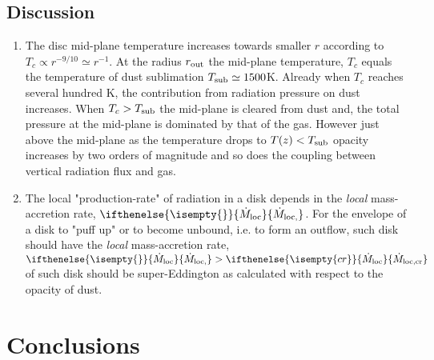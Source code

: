 \documentclass[12pt,english,preprint]{aastex}
\newcommand{\su}[2]{#1_{\rm #2}}
\newcommand{\mdt}[1][]{ 
  \ifthenelse{\isempty{#1}}
  {\dot{M}_{\rm loc}}
  { {\dot M}_{\rm{loc},{#1}} } 
  } %
\newcommand{\Tsub}{ \su{T}{sub} }
\begin{document}
\subsection{Discussion}
\begin{enumerate}
\item 
The disc mid-plane temperature increases towards smaller $r$ according
to $T_{c}\propto r^{-9/10}\simeq r^{-1}$. At the radius $r_{{\rm out}}$
the mid-plane temperature, $T_{c}$ equals the temperature of dust
sublimation $T_{{\rm sub}}\simeq1500$K. Already
when $T_{c}$ reaches several hundred K, the contribution from radiation
pressure on dust increases. When $T_{c}>\Tsub$ the mid-plane is cleared
from dust and, the total pressure at the mid-plane is dominated by
that of the gas. However just above the mid-plane as the temperature
drops to $T(z)<\Tsub$ opacity increases by two orders of magnitude
and so does the coupling between vertical radiation flux and gas.
\item The local "production-rate" of radiation in a disk depends in the
\textit{local} mass-accretion rate, $\mdt$. For the envelope of a
disk to "puff up" or to become unbound, i.e. to form an outflow,
such disk should have the \textit{local} mass-accretion rate, $\mdt > \mdt[cr]$
of such disk should be super-Eddington as calculated with respect
to the opacity of dust.
\end{enumerate}



\section{Conclusions}
\end{document}
